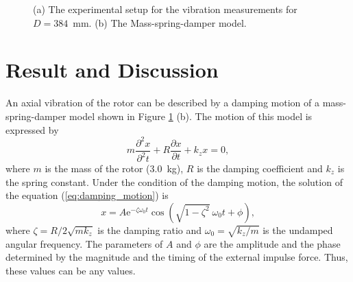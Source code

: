 \documentclass[a4paper,11pt]{jpconf}
\begin{document}
\begin{figure}[htbp]
  \centering
  \begin{minipage}{0.6\hsize}
  \end{minipage}
  \begin{minipage}{0.3\hsize}
    \centering
  \end{minipage}
  \caption{(a) The experimental setup for the vibration measurements for $D=384$~mm. (b) The Mass-spring-damper model.}
  \label{fig:d400}
\end{figure}


\section{Result and Discussion}

An axial vibration of the rotor can be described by a damping motion of a mass-spring-damper model \cite{mds} shown in Figure \ref{fig:d400} (b).
The motion of this model is expressed by
\begin{equation}
  m \frac{\partial^{2} x}{\partial^{2} t} + R \frac{\partial x}{\partial t} + k_{z} x = 0,
  \label{eq:damping_motion}
\end{equation}
where $m$ is the mass of the rotor (3.0~kg), $R$ is the damping coefficient and $k_{z}$ is the spring constant.
Under the condition of the damping motion, the solution of the equation (\ref{eq:damping_motion}) is
\begin{equation}
  x = A \mathrm{e}^{- \zeta \omega_{0} t} \cos( \sqrt{1 - \zeta^{2}} \ \omega_{0} t + \phi),
  \label{eq:damping}
\end{equation}
where $\zeta = R / 2 \sqrt{mk_{z}}$ is the damping ratio and $\omega_{0} = \sqrt{k_{z}/m}$ is the undamped angular frequency.
The parameters of $A$ and $\phi$ are the amplitude and the phase determined by the magnitude and the timing of the external impulse force.
Thus, these values can be any values.
\end{document}
